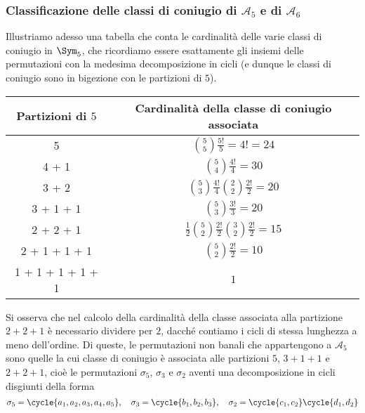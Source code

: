 \documentclass[11pt]{scrartcl}
\begin{document}
	\subsubsection{Classificazione delle classi di coniugio di \texorpdfstring{$\mathcal{A}_5$}{A₅} e di \texorpdfstring{$\mathcal{A}_6$}{A₆}}
	
	Illustriamo adesso una tabella che conta le cardinalità delle varie classi di coniugio
	in $\Sym_5$, che ricordiamo essere esattamente gli insiemi delle permutazioni con
	la medesima decomposizione in cicli (e dunque le classi di coniugio sono in bigezione
	con le partizioni di $5$).
	\begingroup
	\renewcommand{\arraystretch}{2}
	\begin{center}
		\begin{tabular}{c|c}
			Partizioni di $5$ & Cardinalità della classe di coniugio associata\\
			\hline
			5 & $\binom{5}{5} \frac{5!}{5} = 4! = 24$\\
			4 + 1 & $\binom{5}{4} \frac{4!}{4} = 30$\\
			3 + 2 & $\binom{5}{3} \frac{4!}{4} \binom{2}{2} \frac{2!}{2} = 20$\\
			3 + 1 + 1 & $\binom{5}{3} \frac{3!}{3} = 20$\\
			2 + 2 + 1 & $\frac 1 2\binom{5}{2} \frac{2!}{2} \binom{3}{2} \frac{2!}{2} = 15$\\
			2 + 1 + 1 + 1 & $\binom{5}{2} \frac{2!}{2} = 10$\\
			1 + 1 + 1 + 1 + 1 & $1$
		\end{tabular}
	\end{center}
	\endgroup
	Si osserva che nel calcolo della cardinalità della classe associata
	alla partizione $2 + 2 + 1$ è necessario dividere per $2$, dacché contiamo i cicli di
	stessa lunghezza a meno dell'ordine.
	Di queste, le permutazioni non banali che appartengono a $\mathcal{A}_5$ sono quelle
	la cui classe di coniugio è associata alle partizioni $5$, $3 + 1 + 1$ e
	$2 + 2 + 1$, cioè le permutazioni $\sigma_5$, $\sigma_3$ e $\sigma_2$
	aventi una decomposizione in cicli disgiunti della forma
	\[
	\sigma_5 = \cycle{a_1, a_2, a_3, a_4, a_5}, \quad \sigma_3 = \cycle{b_1, b_2, b_3}, \quad \sigma_2 = \cycle{c_1, c_2}\cycle{d_1, d_2}
	\]
	
\end{document}
